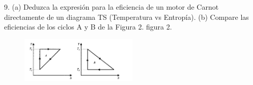 9. (a) Deduzca la expresión para la eficiencia de un motor de Carnot directamente de un diagrama TS (Temperatura vs Entropía). (b) Compare las eficiencias de los ciclos A y B de la Figura 2.
figura 2.

\begin{figure}[h]
    \centering
    \includegraphics[width=0.5\textwidth]{diagram2.png}
    
    \label{fig:figura2}
\end{figure}